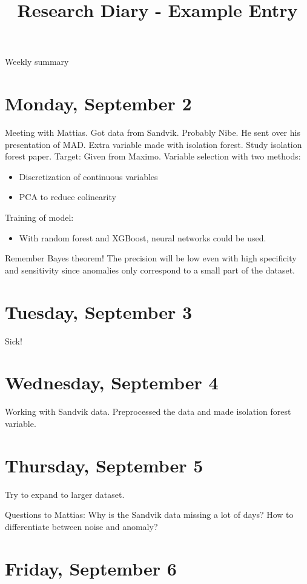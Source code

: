 \documentclass[11pt,letterpaper]{article}
\begin{document}
\univlogo

\title{Research Diary - Example Entry}

{\Huge Weekly summary}\\[5mm]

\section*{Monday, September 2}
Meeting with Mattias. Got data from Sandvik. Probably Nibe. 
He sent over his presentation of MAD. Extra variable made with isolation forest.
Study isolation forest paper. 
Target: Given from Maximo.
Variable selection with two methods:
\begin{itemize}
\item  Discretization of continuous variables
\item  PCA to reduce colinearity
\end{itemize}
Training of model:
\begin{itemize}
\item  With random forest and XGBoost, neural networks could be used.
\end{itemize}

Remember Bayes theorem! The precision will be low even with high specificity and sensitivity since anomalies only correspond to a small part of the dataset.


\section*{Tuesday, September 3}
Sick!

\section*{Wednesday, September 4}
Working with Sandvik data. Preprocessed the data and made isolation forest variable.

\section*{Thursday, September 5}
Try to expand to larger dataset. 

Questions to Mattias:
Why is the Sandvik data missing a lot of days?
How to differentiate between noise and anomaly?


\section*{Friday, September 6}

\printbibliography
\end{document}
